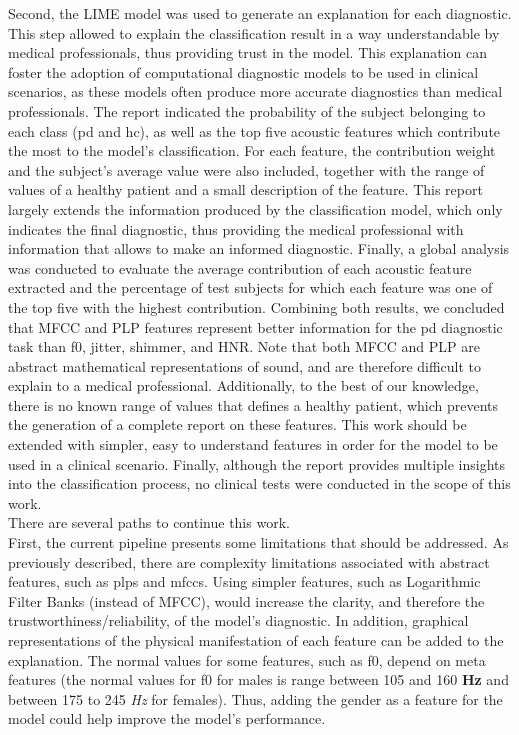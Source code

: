 Second, the LIME model was used to generate an explanation for each diagnostic. This step allowed to explain the classification result in a way understandable by medical professionals, thus providing trust in the model. This
explanation can foster the adoption of computational diagnostic models to be used in clinical scenarios, as these models often produce more accurate diagnostics than
medical professionals. The report indicated the probability of the subject belonging to each class (\gls{pd} and \gls{hc}), as well as the top five acoustic features which contribute the most to the model's classification. For each feature, the contribution weight and the subject's average value were also included, together with the range of values of a healthy patient and a small description of the feature. This report largely extends the information produced by the classification model, which only indicates the final diagnostic, thus providing the medical professional with information that allows to make an informed diagnostic. Finally, a global analysis was conducted to evaluate the average contribution of each acoustic feature extracted and the percentage of test subjects for which each feature was one of the top five with the highest contribution. Combining both results, we concluded that MFCC and PLP features represent better information for the \gls{pd} diagnostic task than \gls{f0}, jitter, shimmer, and HNR.
Note that both MFCC and PLP are abstract mathematical representations of sound, and are therefore difficult to explain to a medical professional. Additionally, to the best of our knowledge, there is no known range of values that defines a healthy patient, which prevents the generation of a complete report on these features. This work should be extended with simpler, easy to understand features in order for the model to be used in a clinical scenario. Finally, although the report provides multiple insights into the classification process, no clinical tests were conducted in the scope of this work. \\
There are several paths to continue this work. \\
First, the current pipeline presents some limitations that should be addressed. As previously described, there are complexity limitations associated with abstract features, such as \gls{plp}s and \gls{mfcc}s. Using simpler features, such as Logarithmic Filter Banks (instead of MFCC), would increase the clarity, and therefore the trustworthiness/reliability, of the model's diagnostic. In addition, graphical representations of the physical manifestation of each feature can be added to the explanation. The normal values for some features, such as \gls{f0}, depend on meta features (the normal values for \gls{f0} for males is range between 105 and 160 \textbf{Hz} and between 175 to 245 \textit{Hz} for females). Thus, adding the gender as a feature for the model could help improve the model's performance. \\
